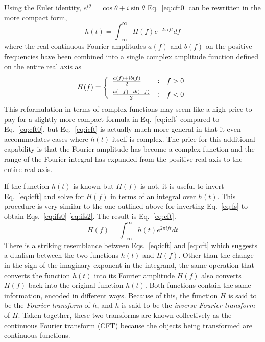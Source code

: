 \documentclass{revtex4}
\begin{document}
Using the Euler identity, $e^{i\theta}= \cos\theta
+ i\sin\theta$ Eq.~\ref{eq:cft0} can be rewritten in the more compact form,
\begin{equation}
h(t) = \int_{-\infty}^{\infty}H(f) e^{-2\pi ift} df
\label{eq:icft}
\end{equation}
where the real continuous Fourier amplitudes $a(f)$ and $b(f)$ on the
positive frequencies have been combined into a single complex amplitude
function defined on the entire real axis as
\begin{equation}
H(f)=\left\{
\begin{array}{lcl}
\frac{a(f)+ib(f)}{2} &:& f>0 \vspace*{2mm} \\
\frac{a(-f)-ib(-f)}{2} &:& f<0
\end{array}
\right.
\end{equation}
This reformulation in terms of complex functions may seem like a high
price to pay for a slightly more compact formula in Eq.~\ref{eq:icft}
compared to Eq.~\ref{eq:cft0}, but Eq.~\ref{eq:icft} is actually much
more general in that it even accommodates cases where $h(t)$ itself is 
complex.  The price for this additional capability is that the Fourier
amplitude has become a complex function and the range of the Fourier
integral has expanded from the positive real axis to the entire real
axis.

If the function $h(t)$ is known but $H(f)$ is not, it is useful to
invert Eq.~\ref{eq:icft} and solve for $H(f)$ in terms of an integral
over $h(t)$.  This procedure is very similar to the one outlined above
for inverting Eq.~\ref{eq:fs} to obtain Eqs.~\ref{eq:ifs0}-\ref{eq:ifs2}.
The result is Eq.~\ref{eq:cft}.
\begin{equation}
H(f) = \int_{-\infty}^{\infty}h(t) e^{2\pi ift} dt
\label{eq:cft}
\end{equation}
There is a striking resemblance between Eqs.~\ref{eq:icft} and \ref{eq:cft}
which suggests a dualism between the two functions $h(t)$ and $H(f)$.
Other than the change in the sign of the imaginary exponent in the
integrand, the same operation that converts the function $h(t)$ into
its Fourier amplitude $H(f)$ also converts $H(f)$ back into the original
function $h(t)$.  Both functions contain the same information, encoded in
different ways.  Because of this, the function $H$ is said to be the
{\em Fourier transform} of $h$, and $h$ is said to be the
{\em inverse Fourier transform} of $H$.  Taken together, these two
transforms are known collectively as the continuous Fourier transform
(CFT) because the objects being transformed are continuous functions.
\end{document}
